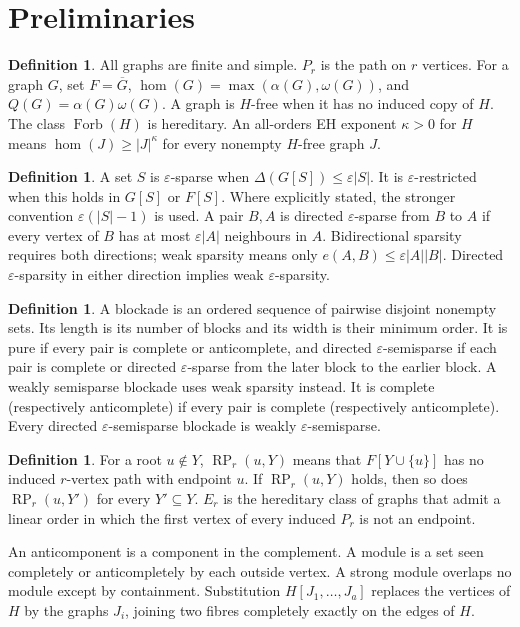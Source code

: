 \documentclass[11pt,a4paper]{article}
\theoremstyle{definition}
\newtheorem{definition}[theorem]{Definition}
\theoremstyle{remark}
\numberwithin{equation}{section}
\DeclareMathOperator{\Forb}{Forb}
\DeclareMathOperator{\RP}{RP}
\begin{document}
\section{Preliminaries}\label{sec:notation}
\begin{definition}
All graphs are finite and simple. \(P_r\) is the path on \(r\) vertices. For a graph \(G\), set \(F=\overline G\), \(\hom(G)=\max(\alpha(G),\omega(G))\), and \(Q(G)=\alpha(G)\omega(G)\). A graph is \(H\)-free when it has no induced copy of \(H\). The class \(\Forb(H)\) is hereditary. An all-orders EH exponent \(\kappa>0\) for \(H\) means \(\hom(J)\ge |J|^\kappa\) for every nonempty \(H\)-free graph \(J\).
\end{definition}
\begin{definition}
A set \(S\) is \(\varepsilon\)-sparse when \(\Delta(G[S])\le\varepsilon|S|\). It is \(\varepsilon\)-restricted when this holds in \(G[S]\) or \(F[S]\). Where explicitly stated, the stronger convention \(\varepsilon(|S|-1)\) is used. A pair \(B,A\) is directed \(\varepsilon\)-sparse from \(B\) to \(A\) if every vertex of \(B\) has at most \(\varepsilon|A|\) neighbours in \(A\). Bidirectional sparsity requires both directions; weak sparsity means only \(e(A,B)\le\varepsilon|A||B|\). Directed \(\varepsilon\)-sparsity in either direction implies weak \(\varepsilon\)-sparsity.
\end{definition}
\begin{definition}
A blockade is an ordered sequence of pairwise disjoint nonempty sets. Its length is its number of blocks and its width is their minimum order. It is pure if every pair is complete or anticomplete, and directed \(\varepsilon\)-semisparse if each pair is complete or directed \(\varepsilon\)-sparse from the later block to the earlier block. A weakly semisparse blockade uses weak sparsity instead. It is complete (respectively anticomplete) if every pair is complete (respectively anticomplete). Every directed \(\varepsilon\)-semisparse blockade is weakly \(\varepsilon\)-semisparse.
\end{definition}
\begin{definition}
For a root \(u\notin Y\), \(\RP_r(u,Y)\) means that \(F[Y\cup\{u\}]\) has no induced \(r\)-vertex path with endpoint \(u\). If \(\RP_r(u,Y)\) holds, then so does \(\RP_r(u,Y')\) for every \(Y'\subseteq Y\). \(E_r\) is the hereditary class of graphs that admit a linear order in which the first vertex of every induced \(P_r\) is not an endpoint.
\end{definition}
An anticomponent is a component in the complement. A module is a set seen completely or anticompletely by each outside vertex. A strong module overlaps no module except by containment. Substitution \(H[J_1,\ldots,J_a]\) replaces the vertices of \(H\) by the graphs \(J_i\), joining two fibres completely exactly on the edges of \(H\).
\end{document}
